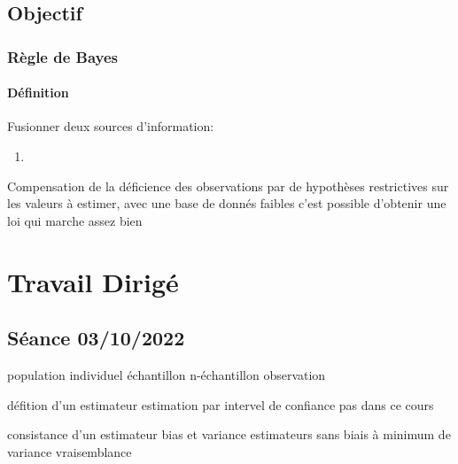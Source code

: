 \documentclass{article}
\begin{document}
\subsection{Objectif}
\subsubsection{Règle de Bayes}
\paragraph{Définition}Fusionner deux sources d'information:
\begin{enumerate}
    \item 
\end{enumerate}

Compensation de la déficience des observations par de hypothèses restrictives sur les valeurs à estimer, avec une base de donnés faibles c'est possible d'obtenir une loi qui marche assez bien




\section{Travail Dirigé}
\subsection{Séance 03/10/2022}
\begin{scriptsize}\mycode
    
\end{scriptsize}

\newpage
population
individuel
échantillon
n-échantillon
observation

défition d'un estimateur
estimation par intervel de confiance pas dans ce cours

consistance d'un estimateur
bias et variance
estimateurs sans biais à minimum de variance
vraisemblance
\end{document}
